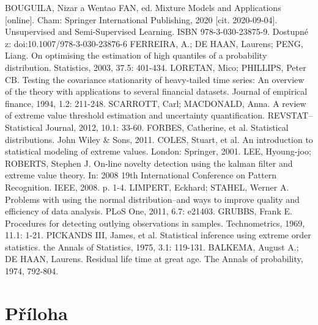 \documentclass[11pt,twoside,openright]{report}
\begin{document}
\begin{thebibliography}{L}
BOUGUILA, Nizar a Wentao FAN, ed. Mixture Models and Applications [online]. Cham: Springer International Publishing, 2020 [cit. 2020-09-04]. Unsupervised and Semi-Supervised Learning. ISBN 978-3-030-23875-9. Dostupné z: doi:10.1007/978-3-030-23876-6
FERREIRA, A.; DE HAAN, Laurens; PENG, Liang. On optimising the estimation of high quantiles of a probability distribution. Statistics, 2003, 37.5: 401-434.
LORETAN, Mico; PHILLIPS, Peter CB. Testing the covariance stationarity of heavy-tailed time series: An overview of the theory with applications to several financial datasets. Journal of empirical finance, 1994, 1.2: 211-248.
SCARROTT, Carl; MACDONALD, Anna. A review of extreme value threshold estimation and uncertainty quantification. REVSTAT–Statistical Journal, 2012, 10.1: 33-60.
FORBES, Catherine, et al. Statistical distributions. John Wiley & Sons, 2011.
COLES, Stuart, et al. An introduction to statistical modeling of extreme values. London: Springer, 2001.
LEE, Hyoung-joo; ROBERTS, Stephen J. On-line novelty detection using the kalman filter and extreme value theory. In: 2008 19th International Conference on Pattern Recognition. IEEE, 2008. p. 1-4.
LIMPERT, Eckhard; STAHEL, Werner A. Problems with using the normal distribution–and ways to improve quality and efficiency of data analysis. PLoS One, 2011, 6.7: e21403.
GRUBBS, Frank E. Procedures for detecting outlying observations in samples. Technometrics, 1969, 11.1: 1-21.
PICKANDS III, James, et al. Statistical inference using extreme order statistics. the Annals of Statistics, 1975, 3.1: 119-131.
BALKEMA, August A.; DE HAAN, Laurens. Residual life time at great age. The Annals of probability, 1974, 792-804.
\end{thebibliography}



\clearpage
\chapter*{Příloha}
\begin{appendices}

\end{appendices}
\end{document}
